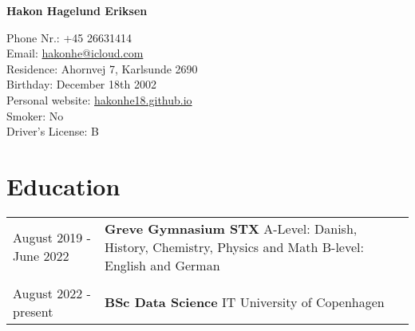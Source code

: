 \documentclass[12pt]{article}
\begin{document}
\begin{center}
     \Huge{\textbf{Hakon Hagelund Eriksen}}
\end{center}
Phone Nr.: \hfill +45 26631414\\
Email:  \hfill \href{mailto:hakonhe@icloud.com}{hakonhe@icloud.com} \\ 
Residence: \hfill Ahornvej 7, Karlsunde 2690 \\
Birthday: \hfill December 18th 2002 \\
Personal website: \hfill \href{hakonhe18.github.io}{hakonhe18.github.io} \\
Smoker: \hfill No \\
Driver's License: \hfill B


\section{Education}
\begin{tabular}{ l p{6in} }
August 2019 -  June 2022 & \textbf{Greve Gymnasium STX } \newline A-Level: Danish, History, Chemistry, Physics and Math \newline B-level: English and German \\
& \\
August 2022 - present & \textbf{BSc Data Science} \newline IT University of Copenhagen \\ 
\end{tabular}
\end{document}
